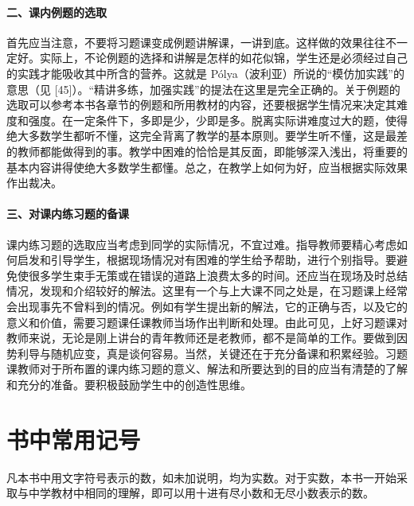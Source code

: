 \paragraph{二、课内例题的选取}
首先应当注意，不要将习题课变成例题讲解课，一讲到底。这样做的效果往往不一定好。实际上，不论例题的选择和讲解是怎样的如花似锦，学生还是必须经过自己的实践才能吸收其中所含的营养。这就是 Pólya（波利亚）所说的“模仿加实践”的意思（见 [45]）。“精讲多练，加强实践”的提法在这里是完全正确的。关于例题的选取可以参考本书各章节的例题和所用教材的内容，还要根据学生情况来决定其难度和强度。在一定条件下，多即是少，少即是多。脱离实际讲难度过大的题，使得绝大多数学生都听不懂，这完全背离了教学的基本原则。要学生听不懂，这是最差的教师都能做得到的事。教学中困难的恰恰是其反面，即能够深入浅出，将重要的基本内容讲得使绝大多数学生都懂。总之，在教学上如何为好，应当根据实际效果作出裁决。

\paragraph{三、对课内练习题的备课}
课内练习题的选取应当考虑到同学的实际情况，不宜过难。指导教师要精心考虑如何启发和引导学生，根据现场情况对有困难的学生给予帮助，进行个别指导。要避免使很多学生束手无策或在错误的道路上浪费太多的时间。还应当在现场及时总结情况，发现和介绍较好的解法。这里有一个与上大课不同之处是，在习题课上经常会出现事先不曾料到的情况。例如有学生提出新的解法，它的正确与否，以及它的意义和价值，需要习题课任课教师当场作出判断和处理。由此可见，上好习题课对教师来说，无论是刚上讲台的青年教师还是老教师，都不是简单的工作。要做到因势利导与随机应变，真是谈何容易。当然，关键还在于充分备课和积累经验。习题课教师对于所布置的课内练习题的意义、解法和所要达到的目的应当有清楚的了解和充分的准备。要积极鼓励学生中的创造性思维。

\section{书中常用记号}

凡本书中用文字符号表示的数，如未加说明，均为实数。对于实数，本书一开始采取与中学教材中相同的理解，即可以用十进有尽小数和无尽小数表示的数。

